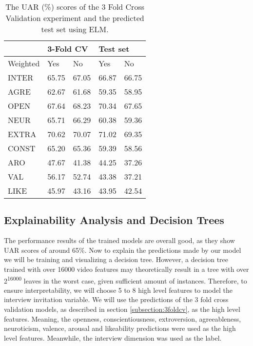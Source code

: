 \begin{table}[h]
\begin{tabular}{|l|r|r|r|r|}
\hline
\rowcolor{Gray}
 & \multicolumn{2}{l|}{3-Fold CV} & \multicolumn{2}{l|}{Test set} \\ \hline
Weighted & \multicolumn{1}{l|}{Yes} & \multicolumn{1}{l|}{No} & \multicolumn{1}{l|}{Yes} & \multicolumn{1}{l|}{No} \\ \hline
INTER & 65.75 & 67.05 & 66.87 & 66.75 \\ \hline
AGRE & 62.67 & 61.68 & 59.35 & 58.95 \\ \hline
OPEN & 67.64 & 68.23 & 70.34 & 67.65 \\ \hline
NEUR & 65.71 & 66.29 & 60.38 & 59.36 \\ \hline
EXTRA & 70.62 & 70.07 & 71.02 & 69.35 \\ \hline
CONST & 65.20 & 65.36 & 59.39 & 58.56 \\ \hline
ARO & 47.67 & 41.38 & 44.25 & 37.26 \\ \hline
VAL & 56.17 & 52.74 & 43.38 & 37.21 \\ \hline
LIKE & 45.97 & 43.16 & 43.95 & 42.54 \\ \hline
\end{tabular}
\caption{The UAR (\%) scores of the 3 Fold Cross Validation experiment and the predicted test set using ELM.}
\label{tab:3foldtestuar}
\end{table}

\subsection{Explainability Analysis and Decision Trees}
The performance results of the trained models are overall good, as they show UAR scores of around 65\%. Now to explain the predictions made by our model we will be training and visualizing a decision tree. However, a decision tree trained with over 16000 video features may theoretically result in a tree with over 2\textsuperscript{16000} leaves in the worst case, given sufficient amount of instances. Therefore, to ensure interpretability, we will choose 5 to 8 high level features to model the interview invitation variable. We will use the predictions of the 3 fold cross validation models, as described in section \ref{subsection:3foldcv}, as the high level features. Meaning, the openness, conscientiousness, extroversion, agreeableness, neuroticism, valence, arousal and likeability predictions were used as the high level features. Meanwhile, the interview dimension was used as the label. 

